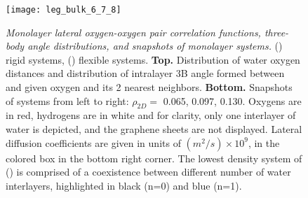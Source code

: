\documentclass[journal=acsnano,manuscript=article]{achemso}
\begin{document}
\begin{figure}[ht!]
	\centering
	\texttt{[image: leg\_bulk\_6\_7\_8]}\\
	\caption{\textit{Monolayer lateral oxygen-oxygen pair correlation functions, three-body angle distributions, and snapshots of monolayer systems.} (\protect{}) rigid systems, (\protect{}) flexible systems.  \textbf{Top.} Distribution of water oxygen distances and distribution of intralayer 3B angle formed between and given oxygen and its 2 nearest neighbors. \textbf{Bottom.} Snapshots of systems from left to right: \(\rho_{2D}=\) 0.065, 0.097, 0.130. Oxygens are in red, hydrogens are in white and for clarity, only one interlayer of water is depicted, and the graphene sheets are not displayed. Lateral diffusion coefficients are given in units of \((m^2/s) \times 10^9\), in the colored box in the bottom right corner. The lowest density system of (\protect{}) is comprised of a coexistence between different number of water interlayers, highlighted in black (n=0) and blue (n=1).}
	\label{fig:struct_6_7_8}
\end{figure}
\end{document}
